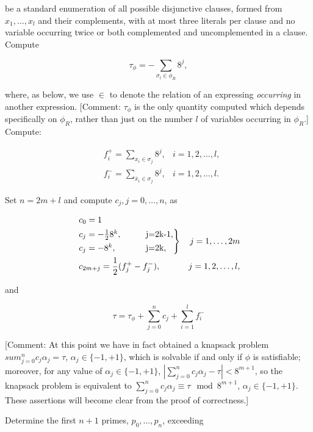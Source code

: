 \documentclass{amsart}
\newcommand{\ov}{\overline}
\theoremstyle{plain}
\begin{document}
be a standard enumeration of all possible disjunctive clauses, formed from $x_1,\ldots,x_l$ and
their complements, with at most three literals per clause and no variable occurring twice or both
complemented and uncomplemented in a clause. Compute

\begin{equation*}
  \tau_\phi = -\sum_{\sigma_l\in\phi_R}8^j,
\end{equation*}

where, as below, we use $\in$ to denote the relation of an expressing \textit{occurring} in another
expression. [Comment: $\tau_\phi$ is the only quantity computed which depends specifically on
$\phi_R$, rather than just on the number $l$ of variables occurring in $\phi_R$.] Compute:

\begin{align*}
  &f_i^+ = \sum_{x_i\in\sigma_j}8^j, &i=1,2,\ldots,l,\\
  &f_i^- = \sum_{\ov{x}_i\in\sigma_j}8^j, &i=1,2,\ldots,l.
\end{align*}

Set $n=2m+l$ and compute $c_j,j=0,\ldots,n$, as

\begin{align*}
  &\;c_0=1\\
  &\begin{rcases*}
  c_j=-\frac{1}{2}8^k,\qquad &j=2k-1,\\
  c_j=-8^k,\qquad &j=2k,\\
  \end{rcases*} &j=1,\ldots,2m\\
  &\;c_{2m+j}=\frac{1}{2}(f_j^+ - f_j^-), &j=1,2,\ldots,l,
\end{align*}

and

\begin{equation*}
  \tau = \tau_\phi + \sum_{j=0}^n c_j + \sum_{i=1}^l f_i^-
\end{equation*}

[Comment: At this point we have in fact obtained a knapsack problem $sum_{j=0}^n c_j\alpha_j=\tau$,
$\alpha_j\in\{-1, +1\}$, which is solvable if and only if $\phi$ is satisfiable; moreover, for any
value of $\alpha_j\in\{-1,+1\}$, $|\sum_{j=0}^n c_j\alpha_j -\tau|<8^{m+1}$, so the knapsack
problem is equivalent to $\sum_{j=0}^n c_j\alpha_j\equiv\tau\mod 8^{m+1}$, $\alpha_j\in\{-1,+1\}$.
These assertions will become clear from the proof of correctness.]

Determine the first $n+1$ primes, $p_0,\ldots,p_n$, exceeding
\end{document}
